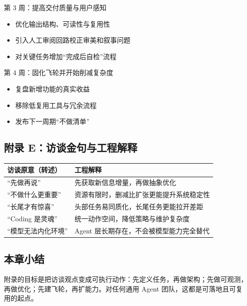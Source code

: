 \begin{knowledgebox}{第 3 周：提高交付质量与用户感知}
\begin{itemize}
    \item 优化输出结构、可读性与复用性
    \item 引入人工审阅回路校正审美和叙事问题
    \item 对关键任务增加“完成后自检”流程
\end{itemize}
\end{knowledgebox}

\begin{knowledgebox}{第 4 周：固化飞轮并开始削减复杂度}
\begin{itemize}
    \item 复盘新增功能的真实收益
    \item 移除低复用工具与冗余流程
    \item 发布下一周期“不做清单”
\end{itemize}
\end{knowledgebox}

\subsection{附录 E：访谈金句与工程解释}

\begin{center}
\begin{tabular}{p{5.4cm}p{7.2cm}}
\toprule
访谈原意（转述） & 工程解释 \\
\midrule
“先做再说” & 先获取新信息增量，再做抽象优化 \\
“不做什么更重要” & 资源有限时，删减比扩张更能提升系统稳定性 \\
“长尾才有惊喜” & 头部任务易同质化，长尾任务更能拉开差距 \\
“Coding 是灵魂” & 统一动作空间，降低策略与维护复杂度 \\
“模型无法内化环境” & Agent 层长期存在，不会被模型能力完全替代 \\
\bottomrule
\end{tabular}
\end{center}

\subsection{本章小结}

附录的目标是把访谈观点变成可执行动作：先定义任务，再做架构；先做可观测，再做优化；先建飞轮，再扩能力。对任何通用 Agent 团队，这都是可落地且可复用的起点。


